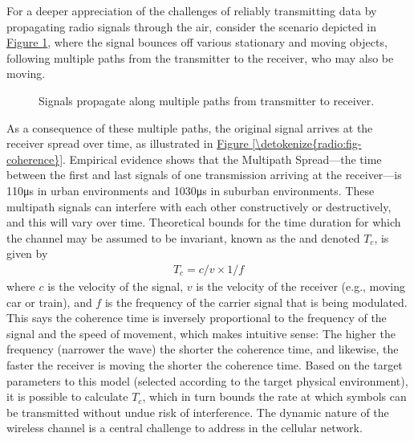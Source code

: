 \documentclass[a4paper,11pt,english]{sphinxmanual}
\let\sphinxpxdimen\pdfpxdimen\else\newdimen\sphinxpxdimen
\begin{document}
\sphinxAtStartPar
For a deeper appreciation of the challenges of reliably transmitting
data by propagating radio signals through the air, consider the
scenario depicted in \hyperref[\detokenize{radio:fig-multipath}]{Figure \ref{\detokenize{radio:fig-multipath}}}, where
the signal bounces off various stationary and moving objects,
following multiple paths from the transmitter to the receiver, who may
also be moving.

\begin{figure}[ht]
\centering
\capstart

\noindent\sphinxincludegraphics[width=600\sphinxpxdimen]{{Slide15}.png}
\caption{Signals propagate along multiple paths from
transmitter to receiver.}\label{\detokenize{radio:id6}}\label{\detokenize{radio:fig-multipath}}\end{figure}

\sphinxAtStartPar
As a consequence of these multiple paths, the original signal arrives at
the receiver spread over time, as illustrated in
\hyperref[\detokenize{radio:fig-coherence}]{Figure \ref{\detokenize{radio:fig-coherence}}}. Empirical evidence shows that the
Multipath Spread—the time between the first and last signals of one
transmission arriving at the receiver—is 1\sphinxhyphen{}10μs in urban
environments and 10\sphinxhyphen{}30μs in suburban environments. These multipath
signals can interfere with each other constructively or destructively,
and this will vary over time. Theoretical
bounds for the time duration for which the channel may be assumed to
be invariant, known as the  and denoted
\(T_c\), is given by
\begin{equation*}
\begin{split}T_c =c/v \times 1/f\end{split}
\end{equation*}
\sphinxAtStartPar
where \(c\) is the velocity of the signal, \(v\) is the
velocity of the receiver (e.g., moving car or train), and \(f\) is
the frequency of the carrier signal that is being modulated. This
says the coherence time is inversely proportional to the frequency of
the signal and the speed of movement, which makes intuitive sense: The
higher the frequency (narrower the wave) the shorter the coherence time,
and likewise, the faster the receiver is moving the shorter the coherence
time. Based on the target parameters to this model (selected according
to the target physical environment), it is possible to calculate
\(T_c\), which in turn bounds the rate at which symbols can be
transmitted without undue risk of interference. The dynamic nature of
the wireless channel is a central challenge to address in the cellular
network.
\end{document}
